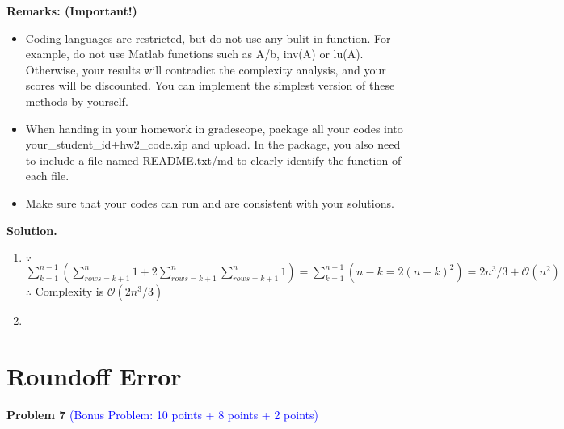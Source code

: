 \documentclass[english,onecolumn]{IEEEtran}
\begin{document}
\begin{enumerate}
\newpage

\noindent\textbf{Remarks: (Important!)}
\begin{itemize}
    \item Coding languages are restricted, but do not use any bulit-in function. For example, do not use {\sf Matlab} functions such as {\sf A/b}, {\sf inv(A)} or {\sf lu(A)}. Otherwise, your results will contradict the complexity analysis, and your scores will be discounted. You can implement the simplest version of these methods by yourself.
    \item When handing in your homework in gradescope, package all your codes into {\sf your\_student\_id+hw2\_code.zip} and upload. In the package, you also need to include a file named {\sf README.txt/md} to clearly identify the function of each file.
     \item Make sure that your codes can run and are consistent with your solutions.
\end{itemize}
\end{enumerate} 

\noindent\textbf{Solution.}
\begin{enumerate}
    \item 
    $\because$ $\sum _{k=1}^{n-1}(\sum_{rows=k+1}^{n}1+2\sum_{rows=k+1}^{n}\sum_{rows=k+1}^{n}1)=\sum _{k=1}^{n-1}(n-k=2(n-k)^2)=2n^3/3+\mathcal{O}(n^2)$\\
    $\therefore$ Complexity is $\mathcal{O}(2n^3/3)$
    \item 
\end{enumerate}

\newpage

\section{Roundoff Error}
\noindent\textbf{Problem 7} \textcolor{blue}{(Bonus Problem: 10 points + 8 points + 2 points)}
\end{document}
